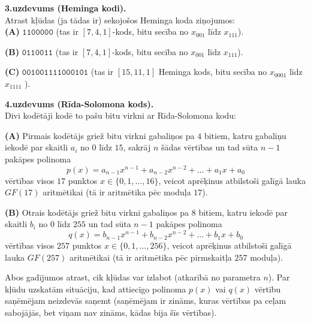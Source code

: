 \documentclass[a4paper,12pt]{article}
\begin{document}
\vspace{20pt}
{\bf 3.uzdevums (Heminga kodi).}\\
Atrast kļūdas (ja tādas ir) sekojošos Heminga koda ziņojumos:\\
{\bf (A)} $\mathtt{1100000}$ (tas ir $[7,4,1]$-kods, bitu secība no $x_{001}$ līdz $x_{111}$). 

\vspace{5pt}
{\bf (B)} $\mathtt{0110011}$ (tas ir $[7,4,1]$-kods, bitu secība no $x_{001}$ līdz $x_{111}$). 

\vspace{5pt}
{\bf (C)} $\mathtt{001001111000101}$ (tas ir $[15,11,1]$ Heminga kods, bitu secība \textendash{} no $x_{0001}$ līdz
$x_{1111}$ ).



\vspace{20pt}
{\bf 4.uzdevums (Rīda-Solomona kods).}\\
Divi kodētāji kodē to pašu bitu virkni ar Rīda-Solomona kodu:

\vspace{5pt}
{\bf (A)} Pirmais kodētājs griež bitu virkni 
gabaliņos pa $4$ bitiem, katru gabaliņu iekodē par skaitli $a_i$ no $0$ līdz $15$, sakrāj $n$ šādas vērtības 
un tad sūta $n-1$ pakāpes polinoma 
$$p(x) = a_{n-1}x^{n-1} + a_{n-2}x^{n-2} + \ldots + a_1x + a_0$$
vērtības visos $17$ punktos $x \in \{ 0,1,\ldots,16 \}$, veicot aprēķinus atbilstoši galīgā lauka $GF(17)$ 
aritmētikai (tā ir aritmētika pēc moduļa $17$).

\vspace{5pt}
{\bf (B)} Otrais kodētājs griež bitu virkni gabaliņos pa $8$ bitiem, katru iekodē par skaitli $b_i$ no $0$ līdz $255$ 
un tad sūta $n-1$ pakāpes polinoma 
$$q(x) = b_{n-1}x^{n-1} + b_{n-2}x^{n-2} + \ldots + b_1x + b_0$$
vērtības visos $257$ punktos $x \in \{ 0,1,\ldots,256 \}$, vei\-cot aprēķinus atbilstoši galīgā lauka $GF(257)$ 
aritmētikai (tā ir aritmētika pēc pirmskaitļa $257$ moduļa). 

\vspace{5pt}
Abos gadījumos atrast, cik kļūdas var izlabot (at\-ka\-rī\-bā no parametra $n$). Par kļūdu uzskatām situāciju, kad 
attiecīgo polinoma $p(x)$ vai $q(x)$ vērtību saņēmējam neizdevās saņemt (saņēmējam ir zināms, kuras vērtības pa ceļam 
sabojājās, bet viņam nav zināms, kādas bija šīs vērtības). 
\end{document}

